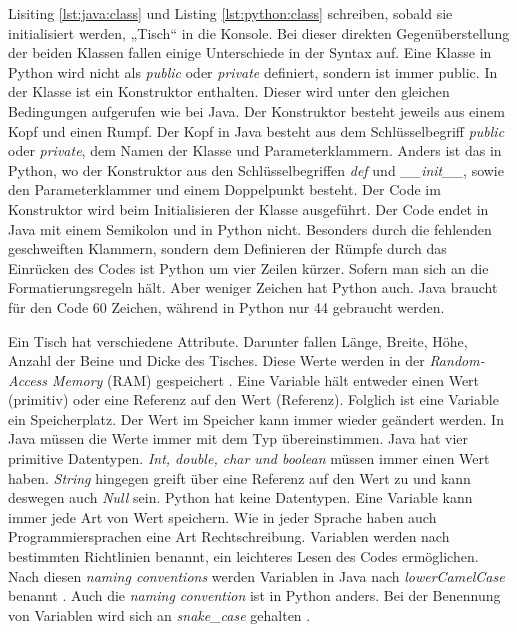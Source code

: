 Lisiting \ref{lst:java:class} und Listing \ref{lst:python:class} schreiben, sobald sie initialisiert werden, „Tisch“ in die Konsole. Bei dieser direkten Gegenüberstellung der beiden Klassen fallen einige Unterschiede in der Syntax auf. Eine Klasse in Python wird nicht als \textit{public} oder \textit{private} definiert, sondern ist immer public. In der Klasse ist ein Konstruktor enthalten. Dieser wird unter den gleichen Bedingungen aufgerufen wie bei Java. Der Konstruktor besteht jeweils aus einem Kopf und einen Rumpf. Der Kopf in Java besteht aus dem Schlüsselbegriff \textit{public} oder \textit{private}, dem Namen der Klasse und Parameterklammern. Anders ist das in Python, wo der Konstruktor aus den Schlüsselbegriffen \textit{def} und \textit{\_\_init\_\_}, sowie den Parameterklammer und einem Doppelpunkt besteht. Der Code im Konstruktor wird beim Initialisieren der Klasse ausgeführt. Der Code endet in Java mit einem Semikolon und in Python nicht. Besonders durch die fehlenden geschweiften Klammern, sondern dem Definieren der Rümpfe durch das Einrücken des Codes ist Python um vier Zeilen kürzer. Sofern man sich an die Formatierungsregeln hält. Aber weniger Zeichen hat Python auch. Java braucht für den Code 60 Zeichen, während in Python nur 44 gebraucht werden. \par

Ein Tisch hat verschiedene Attribute. Darunter fallen Länge, Breite, Höhe, Anzahl der Beine und Dicke des Tisches. Diese Werte werden in der \textit{Random-Access Memory} (RAM) gespeichert \cite{Louis:2010}. Eine Variable hält entweder einen Wert (primitiv) oder eine Referenz auf den Wert (Referenz). Folglich ist eine Variable ein Speicherplatz. Der Wert im Speicher kann immer wieder geändert werden. In Java müssen die Werte immer mit dem Typ übereinstimmen. Java hat vier primitive Datentypen. \textit{Int, double, char und boolean} müssen immer einen Wert haben. \textit{String} hingegen greift über eine Referenz auf den Wert zu und kann deswegen auch \textit{Null} sein. Python hat keine Datentypen. Eine Variable kann immer jede Art von Wert speichern. Wie in jeder Sprache haben auch Programmiersprachen eine Art Rechtschreibung. Variablen werden nach bestimmten Richtlinien benannt, ein leichteres Lesen des Codes ermöglichen. Nach diesen \textit{naming conventions} werden Variablen in Java nach \textit{lowerCamelCase} benannt \cite{Microsoft:CapCon}. Auch die \textit{naming convention} ist in Python anders. Bei der Benennung von Variablen wird sich an \textit{snake\_case} gehalten \cite{Ims:h-s}. \cite{JavaNC}\cite{PythonStyle}\cite{JVMS}

